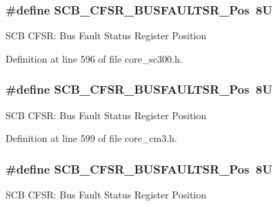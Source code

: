 \subsubsection[{\texorpdfstring{S\+C\+B\+\_\+\+C\+F\+S\+R\+\_\+\+B\+U\+S\+F\+A\+U\+L\+T\+S\+R\+\_\+\+Pos}{SCB_CFSR_BUSFAULTSR_Pos}}]{\setlength{\rightskip}{0pt plus 5cm}\#define S\+C\+B\+\_\+\+C\+F\+S\+R\+\_\+\+B\+U\+S\+F\+A\+U\+L\+T\+S\+R\+\_\+\+Pos~8U}\hypertarget{group___c_m_s_i_s___s_c_b_ga555a24f4f57d199f91d1d1ab7c8c3c8a}{}\label{group___c_m_s_i_s___s_c_b_ga555a24f4f57d199f91d1d1ab7c8c3c8a}
S\+CB C\+F\+SR\+: Bus Fault Status Register Position 

Definition at line 596 of file core\+\_\+sc300.\+h.

\subsubsection[{\texorpdfstring{S\+C\+B\+\_\+\+C\+F\+S\+R\+\_\+\+B\+U\+S\+F\+A\+U\+L\+T\+S\+R\+\_\+\+Pos}{SCB_CFSR_BUSFAULTSR_Pos}}]{\setlength{\rightskip}{0pt plus 5cm}\#define S\+C\+B\+\_\+\+C\+F\+S\+R\+\_\+\+B\+U\+S\+F\+A\+U\+L\+T\+S\+R\+\_\+\+Pos~8U}\hypertarget{group___c_m_s_i_s___s_c_b_ga555a24f4f57d199f91d1d1ab7c8c3c8a}{}\label{group___c_m_s_i_s___s_c_b_ga555a24f4f57d199f91d1d1ab7c8c3c8a}
S\+CB C\+F\+SR\+: Bus Fault Status Register Position 

Definition at line 599 of file core\+\_\+cm3.\+h.

\subsubsection[{\texorpdfstring{S\+C\+B\+\_\+\+C\+F\+S\+R\+\_\+\+B\+U\+S\+F\+A\+U\+L\+T\+S\+R\+\_\+\+Pos}{SCB_CFSR_BUSFAULTSR_Pos}}]{\setlength{\rightskip}{0pt plus 5cm}\#define S\+C\+B\+\_\+\+C\+F\+S\+R\+\_\+\+B\+U\+S\+F\+A\+U\+L\+T\+S\+R\+\_\+\+Pos~8U}\hypertarget{group___c_m_s_i_s___s_c_b_ga555a24f4f57d199f91d1d1ab7c8c3c8a}{}\label{group___c_m_s_i_s___s_c_b_ga555a24f4f57d199f91d1d1ab7c8c3c8a}
S\+CB C\+F\+SR\+: Bus Fault Status Register Position 

